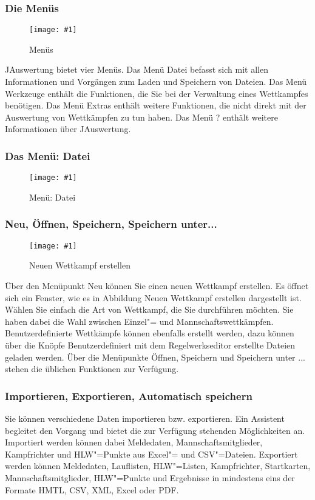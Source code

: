 \documentclass[11pt,a4paper,twoside,ngerman]{article}
\newcommand{\hsmimage}[3]{\begin{figure}[!ht]\centering\texttt{[image: \#1]}\caption{#3}\end{figure}}
\begin{document}
\subsubsection*{Die Menüs}

\hsmimage{pics/menu}{.20\textwidth}{Menüs}
JAuswertung bietet vier Menüs. Das Menü \glqq{}Datei\grqq{} befasst sich mit allen Informationen und Vorgängen zum Laden und Speichern von Dateien. Das Menü \glqq{}Werkzeuge\grqq{} enthält die Funktionen, die Sie bei der Verwaltung eines Wettkampfes benötigen. Das Menü Extras enthält weitere Funktionen, die nicht direkt mit der Auswertung von Wettkämpfen zu tun haben. Das Menü \glqq{}?\grqq{} enthält weitere Informationen über JAuswertung.


\subsubsection*{Das Menü: Datei}

\hsmimage{pics/menu-datei}{.49\textwidth}{Menü: Datei}

\subsubsection*{Neu, Öffnen, Speichern, Speichern unter...}

\hsmimage{pics/neuer-wettkampf}{.66\textwidth}{Neuen Wettkampf erstellen}
\label{lbl:jauswertungmenus:neu}Über den Menüpunkt \glqq{}Neu\grqq{} können Sie einen neuen Wettkampf erstellen. Es öffnet sich ein Fenster, wie es in Abbildung \glqq{}Neuen Wettkampf erstellen\grqq{} dargestellt ist. Wählen Sie einfach die Art von Wettkampf, die Sie durchführen möchten. Sie haben dabei die Wahl zwischen Einzel"= und Mannschaftswettkämpfen. Benutzerdefinierte Wettkämpfe können ebenfalls erstellt werden, dazu können über die Knöpfe \glqq{}Benutzerdefiniert\grqq{} mit dem Regelwerkseditor erstellte Dateien geladen werden. Über die Menüpunkte \glqq{}Öffnen\grqq{}, \glqq{}Speichern\grqq{} und \glqq{}Speichern unter ...\grqq{} stehen die üblichen Funktionen zur Verfügung.


\subsubsection*{Importieren, Exportieren, Automatisch speichern}
Sie können verschiedene Daten importieren bzw. exportieren. Ein Assistent begleitet den Vorgang und bietet die zur Verfügung stehenden Möglichkeiten an. Importiert werden können dabei Meldedaten, Mannschaftsmitglieder, Kampfrichter und HLW"=Punkte aus Excel"= und CSV"=Dateien. Exportiert werden können Meldedaten, Lauflisten, HLW"=Listen, Kampfrichter, Startkarten, Mannschaftsmitglieder, HLW"=Punkte und Ergebnisse in mindestens eins der Formate HMTL, CSV, XML, Excel oder PDF.
\end{document}
